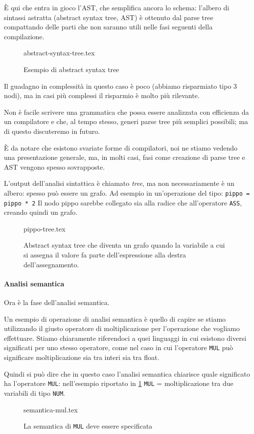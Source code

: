 \documentclass[class=book, crop=false, oneside, 12pt]{standalone}
\begin{document}
È qui che entra in gioco l’AST, che semplifica ancora lo schema: l’albero di sintassi astratta (abstract syntax tree, AST) è ottenuto dal parse tree compattando delle parti che non saranno utili nelle fasi seguenti della compilazione.
\begin{figure}[H]
	\centering
	{abstract-syntax-tree.tex}
	\caption{Esempio di abstract syntax tree}
	\label{esempio_AST}
\end{figure}
Il guadagno in complessità in questo caso è poco (abbiamo risparmiato tipo 3 nodi), ma in casi più complessi il risparmio è molto più rilevante.

Non è facile scrivere una grammatica che possa essere analizzata con efficienza da un compilatore e che, al tempo stesso, generi parse tree più semplici possibili; ma di questo discuteremo in futuro.

È da notare che esistono svariate forme di compilatori, noi ne stiamo vedendo una presentazione generale, ma, in molti casi, fasi come creazione di parse tree e AST vengono spesso sovrapposte.

L’output dell’analisi sintattica è chiamato \emph{tree}, ma non necessariamente è un albero: spesso può essere un grafo. Ad esempio in un’operazione del tipo:
\texttt{pippo = pippo * 2}
Il nodo pippo sarebbe collegato sia alla radice che all’operatore \texttt{ASS}, creando quindi un grafo.
\begin{figure}[H]
	\centering
	{pippo-tree.tex}
	\caption{Abstract syntax tree che diventa un grafo quando la variabile a cui si assegna il valore fa parte dell'espressione alla destra dell'assegnamento.}
	\label{esempio_pippo}
\end{figure}

\paragraph{Analisi semantica}
Ora è la fase dell’analisi semantica.

Un esempio di operazione di analisi semantica è quello di capire se stiamo utilizzando il giusto operatore di moltiplicazione per l’operazione che vogliamo effettuare. Stiamo chiaramente riferendoci a quei linguaggi in cui esistono diversi significati per uno stesso operatore, come nel caso in cui l'operatore \texttt{MUL} può significare moltiplicazione sia tra interi sia tra float.

Quindi si può dire che in questo caso l’analisi semantica chiarisce quale significato ha l’operatore \texttt{MUL}: nell’esempio riportato in \ref{esempio_AST} \texttt{MUL} = moltiplicazione tra due variabili di tipo \texttt{NUM}.
\begin{figure}[H]
	\centering
	{semantica-mul.tex}
	\caption{La semantica di \texttt{MUL} deve essere specificata}
\end{figure}
\end{document}
